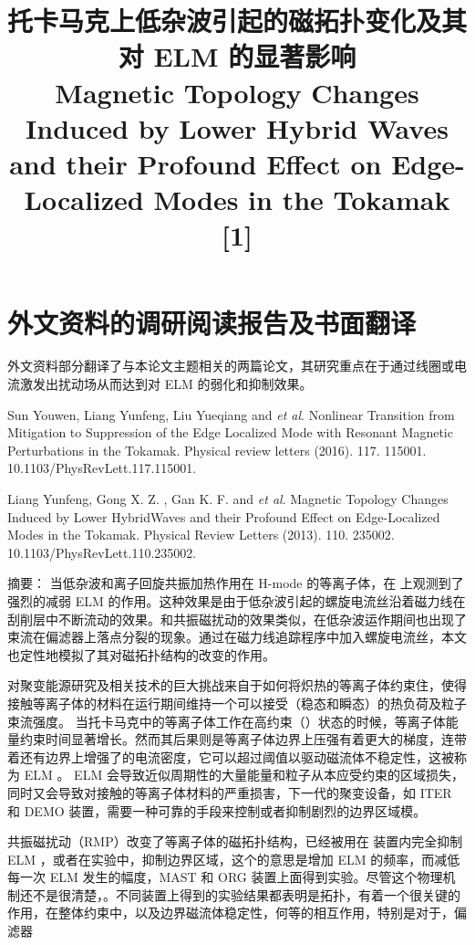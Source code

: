 
\chapter{外文资料的调研阅读报告及书面翻译}

外文资料部分翻译了与本论文主题相关的两篇论文，其研究重点在于通过线圈或电流激发出扰动场从而达到对 ELM 的弱化和抑制效果。


\begin{translationbib}
  \item Sun Youwen, Liang Yunfeng, Liu Yueqiang and \textit{et al}. Nonlinear Transition from Mitigation to Suppression of the Edge Localized Mode with Resonant Magnetic Perturbations in the \east Tokamak. Physical review letters (2016). 117. 115001. 10.1103/PhysRevLett.117.115001. 
  \item Liang Yunfeng, Gong X. Z. , Gan K. F. and \textit{et al}. Magnetic Topology Changes Induced by Lower HybridWaves and their Profound Effect on Edge-Localized Modes in the \east Tokamak. Physical Review Letters (2013). 110. 235002. 10.1103/PhysRevLett.110.235002. 
\end{translationbib}


\title{\textbf{ \east  托卡马克上低杂波引起的磁拓扑变化及其对 ELM 的显著影响\\Magnetic Topology Changes Induced by Lower Hybrid Waves and their Profound Effect on Edge-Localized Modes in the \east Tokamak} [1]}

{\heiti 摘要：} {\kaishu 当低杂波和离子回旋共振加热作用在 H-mode 的等离子体，在  \east  上观测到了强烈的减弱 ELM 的作用。这种效果是由于低杂波引起的螺旋电流丝沿着磁力线在刮削层中不断流动的效果。和共振磁扰动的效果类似，在低杂波运作期间也出现了束流在偏滤器上落点分裂的现象。通过在磁力线追踪程序中加入螺旋电流丝，本文也定性地模拟了其对磁拓扑结构的改变的作用。}



对聚变能源研究及相关技术的巨大挑战来自于如何将炽热的等离子体约束住，使得接触等离子体的材料在运行期间维持一个可以接受（稳态和瞬态）的热负荷及粒子束流强度。
当托卡马克中的等离子体工作在高约束（\Hmode）状态的时候，等离子体能量约束时间显著增长。然而其后果则是等离子体边界上压强有着更大的梯度，连带着还有边界上增强了的电流密度，它可以超过阈值以驱动磁流体不稳定性，这被称为 ELM 。 ELM 会导致近似周期性的大量能量和粒子从本应受约束的区域损失，同时又会导致对接触的等离子体材料的严重损害，下一代的聚变设备，如 ITER 和 DEMO 装置，需要一种可靠的手段来控制或者抑制剧烈的边界区域模。

共振磁扰动（RMP）改变了等离子体的磁拓扑结构，已经被用在 \ddd 装置内完全抑制 ELM ，或者在实验中，抑制边界区域，这个的意思是增加 ELM 的频率，而减低每一次 ELM 发生的幅度，MAST 和 ORG 装置上面得到实验。尽管这个物理机制还不是很清楚，。不同装置上得到的实验结果都表明是拓扑，有着一个很关键的作用，在整体约束中，以及边界磁流体稳定性，何等的相互作用，特别是对于，偏滤器


